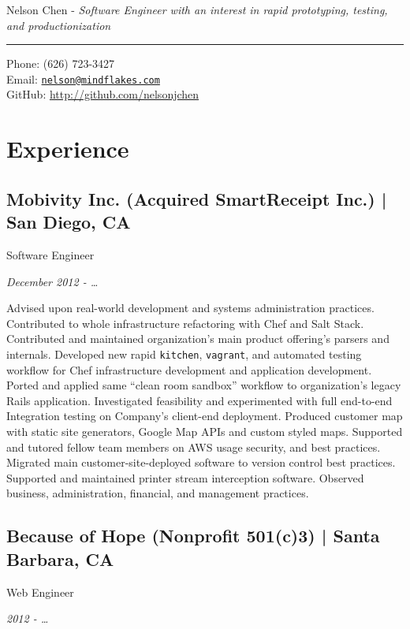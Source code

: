 \documentclass[10pt, letter]{article}
\makeatletter
\def\myname{Nelson Chen}
\def\myemail{nelson@mindflakes.com}
\def\mycellphone{(626) 723-3427}
\def\mygithub{nelsonjchen}
\newcommand{\years}[1]{\marginnote{#1}}
\renewcommand{\years}[1]{{\emph{#1}}}
\makeatother
\begin{document}
{\LARGE \myname} - \emph{Software Engineer with an interest in rapid prototyping, testing, and productionization}\\
\hrule
\begin{multicols}{2}
{Phone: \mycellphone}\\[.01cm]
{Email: \href{mailto:\myemail}{\texttt{\myemail}}}\\[.05cm]
{GitHub: \href{http://www.github.com/\mygithub}{http://github.com/\mygithub}}
\section*{Experience}

\subsection*{Mobivity Inc. (Acquired SmartReceipt Inc.) | {\footnotesize{San Diego, CA}}}

Software Engineer

\years{December 2012 - \ldots}

Advised upon real-world development and systems administration practices.
Contributed to whole infrastructure refactoring with Chef and Salt Stack.
Contributed and maintained organization's main product offering's parsers and
internals. Developed new rapid \texttt{kitchen}, \texttt{vagrant}, and
automated testing workflow for Chef infrastructure development and application
development. Ported and applied same ``clean room sandbox'' workflow to
organization's legacy Rails application. Investigated feasibility and
experimented with full end-to-end Integration testing on Company's client-end
deployment. Produced customer map with static site generators, Google Map APIs
and custom styled maps. Supported and tutored fellow team members on AWS usage
security, and best practices. Migrated main customer-site-deployed software to
version control best practices.  Supported and maintained printer stream interception software.
Observed business, administration, financial, and management practices.

\subsection*{Because of Hope (Nonprofit 501(c)3) | {\footnotesize{Santa Barbara, CA}}}

Web Engineer

\years{2012 - \ldots}


\end{multicols}
\end{document}
